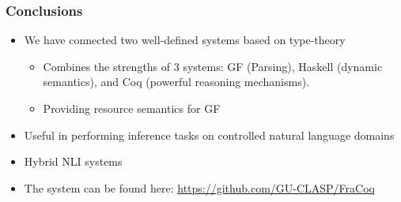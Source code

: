 \documentclass[11pt]{beamer}
\begin{document}
\begin{frame}
  \frametitle{Conclusions}
  \begin{itemize}
  \item We have connected two well-defined systems based on
    type-theory
    \begin{itemize}
    \item Combines the strengths of 3 systems: GF (Parsing), Haskell
      (dynamic semantics), and Coq (powerful reasoning mechanisms).
    \item Providing resource semantics for GF
    \end{itemize}

  \item Useful in performing inference tasks on controlled natural
    language domains

  \item Hybrid NLI systems
  \item The system can be found here:  \href{https://github.com/GU-CLASP/FraCoq}{https://github.com/GU-CLASP/FraCoq}
  \end{itemize}
\end{frame}




\end{document}
